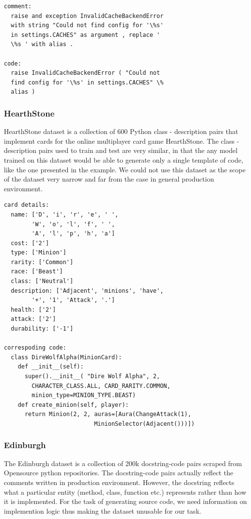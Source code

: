 \documentclass{IEEEtran}
\begin{document}
      \begin{lstlisting}[frame=single,basicstyle=\small]
comment:
  raise and exception InvalidCacheBackendError 
  with string "Could not find config for '\%s' 
  in settings.CACHES" as argument , replace ' 
  \%s ' with alias .

code:
  raise InvalidCacheBackendError ( "Could not 
  find config for '\%s' in settings.CACHES" \% 
  alias )
      \end{lstlisting}

        \subsubsection{HearthStone}
        HearthStone dataset is a collection of 600 Python class - description pairs
        that implement cards for the online multiplayer card game HearthStone.
        The class - description pairs used to train and test are very similar, in that
        the any model trained on this dataset would be able to generate only a
        single template of code, like the one presented in the example. We could not
        use this dataset as the scope of the dataset very narrow and far from the case
        in general production environment. 

      \begin{lstlisting}[frame=single,basicstyle=\scriptsize]
card details:
  name: ['D', 'i', 'r', 'e', ' ', 
        'W', 'o', 'l', 'f', ' ', 
        'A', 'l', 'p', 'h', 'a']
  cost: ['2']
  type: ['Minion']
  rarity: ['Common']
  race: ['Beast']
  class: ['Neutral']
  description: ['Adjacent', 'minions', 'have', 
        '+', '1', 'Attack', '.']
  health: ['2']
  attack: ['2']
  durability: ['-1']

correspoding code:
  class DireWolfAlpha(MinionCard):
    def __init__(self):
      super().__init__( "Dire Wolf Alpha", 2, 
        CHARACTER_CLASS.ALL, CARD_RARITY.COMMON, 
        minion_type=MINION_TYPE.BEAST)
    def create_minion(self, player):
      return Minion(2, 2, auras=[Aura(ChangeAttack(1), 
                          MinionSelector(Adjacent()))])
      \end{lstlisting}

        \subsubsection{Edinburgh}
        The Edinburgh dataset is a collection of 200k docstring-code pairs scraped
        from Opensource python repositories. The docstring-code pairs actually
        reflect the comments written in production environment. However, the docstring
        reflects what a particular entity (method, class, function etc.) represents
        rather than how it is implemented. For the task of generating source code,
        we need information on implemention logic thus making the dataset unusable
        for our task.
\end{document}
